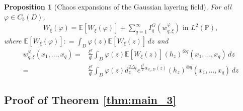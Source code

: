 \documentclass[a4paper, 11pt, reqno]{amsart}
\theoremstyle{definition} \newtheorem{defn}{Definition}[section]
\theoremstyle{remark} \newtheorem{rem}[defn]{Remark}
\theoremstyle{remark} \newtheorem*{rem*}{Remark}
\theoremstyle{plain} \newtheorem{thm}[defn]{Theorem}
\theoremstyle{plain} \newtheorem{lem}[defn]{Lemma}
\theoremstyle{plain} \newtheorem{prop}[defn]{Proposition}
\theoremstyle{plain} \newtheorem{cor}[defn]{Corollary}
\theoremstyle{remark} \newtheorem{exm}[defn]{\textbf{Example}}
\theoremstyle{remark} \newtheorem{exms}[defn]{\textbf{Examples}}
\theoremstyle{remark} \newtheorem*{bl}{}
\numberwithin{equation}{section} %
\newcommand{\pr}{\mathbb{P}}
\newcommand{\E}{\mathbb{E}}
\begin{document}
	\begin{prop}[Chaos expansions of the Gaussian layering field]\label{prop:GLF_chaos_exp}
	    For all $\varphi \in C_b(D)$, 
			\begin{align}\label{eq:W_conv_1}
				W_{\xi}(\varphi) = \E [W_{\xi}(\varphi)] + \sum_{q=1}^{\infty} I^G_q(w^{\varphi}_{q, \xi}) \text{ in } L^2(\pr),
			\end{align}
			where $\E[W_{\xi}(\varphi)] : = \int_D \varphi(z) \E[W_{\xi}(z)] \, dz$ and
			\begin{align}\label{eq:W_conv_2}
				w^{\varphi}_{q, \xi} (x_1, \ldots, x_q) = & \frac{\xi^q}{q!} \int_D \varphi(z)\E[W_{\xi}(z)]  (h_z)^{\otimes q} (x_1, \ldots, x_q) \, dz
				\nonumber \\
				= & \frac{\xi^q}{q!} \int_D \varphi(z)d_z^{2\Delta_{\xi} } e^{\frac{\xi^2}{2} \alpha_{d_z, D}(z) }   (h_z)^{\otimes q} (x_1, \ldots, x_q) \, dz
			\end{align}		
	\end{prop}
    
	\subsection{Proof of Theorem \ref{thm:main_3}}	
	
\end{document}
